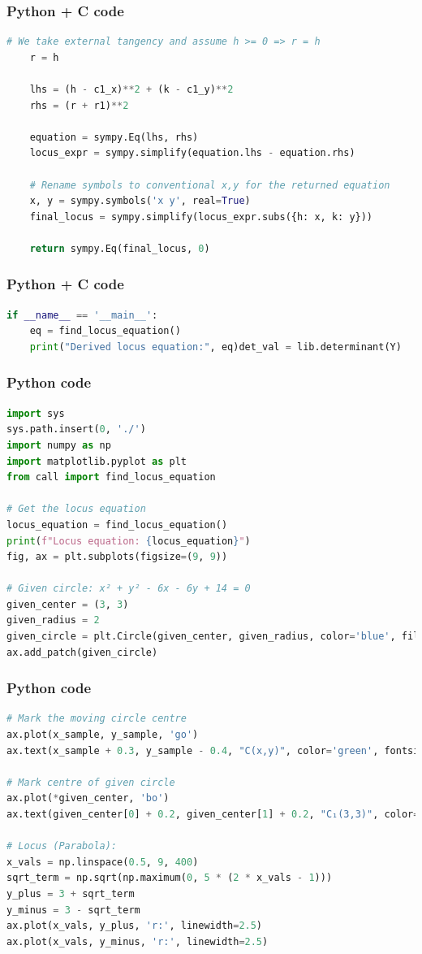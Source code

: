 \documentclass{beamer}
\begin{document}
\begin{frame}[fragile]
    \frametitle{Python + C code}

    \begin{lstlisting}[language=Python]
    # We take external tangency and assume h >= 0 => r = h
    r = h

    lhs = (h - c1_x)**2 + (k - c1_y)**2
    rhs = (r + r1)**2

    equation = sympy.Eq(lhs, rhs)
    locus_expr = sympy.simplify(equation.lhs - equation.rhs)

    # Rename symbols to conventional x,y for the returned equation
    x, y = sympy.symbols('x y', real=True)
    final_locus = sympy.simplify(locus_expr.subs({h: x, k: y}))

    return sympy.Eq(final_locus, 0)
\end{lstlisting}
\end{frame}
\begin{frame}[fragile]
\frametitle{Python + C code}
    \begin{lstlisting}[language=Python]
if __name__ == '__main__':
    eq = find_locus_equation()
    print("Derived locus equation:", eq)det_val = lib.determinant(Y)
    \end{lstlisting}
\end{frame}
\begin{frame}[fragile]
\frametitle{Python code}
    \begin{lstlisting}[language=Python]
import sys
sys.path.insert(0, './')
import numpy as np
import matplotlib.pyplot as plt
from call import find_locus_equation

# Get the locus equation
locus_equation = find_locus_equation()
print(f"Locus equation: {locus_equation}")
fig, ax = plt.subplots(figsize=(9, 9))

# Given circle: x² + y² - 6x - 6y + 14 = 0
given_center = (3, 3)
given_radius = 2
given_circle = plt.Circle(given_center, given_radius, color='blue', fill=False, linewidth=2)
ax.add_patch(given_circle)
     \end{lstlisting}
\end{frame}
\begin{frame}[fragile]
\frametitle{Python code}
    \begin{lstlisting}[language=Python]
    # Mark the moving circle centre
ax.plot(x_sample, y_sample, 'go')
ax.text(x_sample + 0.3, y_sample - 0.4, "C(x,y)", color='green', fontsize=11, fontweight='bold')

# Mark centre of given circle
ax.plot(*given_center, 'bo')
ax.text(given_center[0] + 0.2, given_center[1] + 0.2, "C₁(3,3)", color='blue', fontsize=11, fontweight='bold')

# Locus (Parabola):
x_vals = np.linspace(0.5, 9, 400)
sqrt_term = np.sqrt(np.maximum(0, 5 * (2 * x_vals - 1)))
y_plus = 3 + sqrt_term
y_minus = 3 - sqrt_term
ax.plot(x_vals, y_plus, 'r:', linewidth=2.5)
ax.plot(x_vals, y_minus, 'r:', linewidth=2.5)
       \end{lstlisting}
\end{frame}
\end{document}
